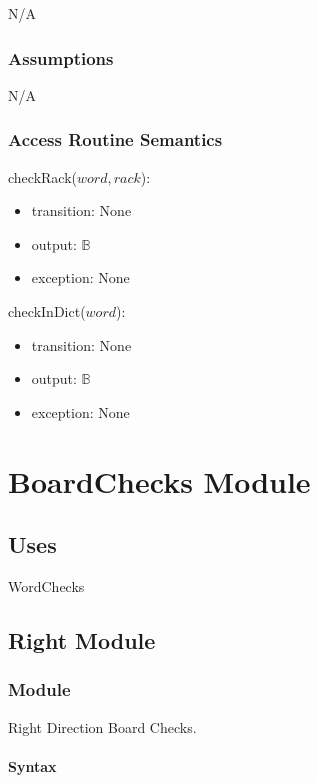 \documentclass[12pt]{article}
\begin{document}
N/A

\subsubsection* {Assumptions}

N/A

\subsubsection* {Access Routine Semantics}

\noindent checkRack($word, rack$):
\begin{itemize}
\item transition: None
\item output: $\mathbb{B}$
\item exception: None
\end{itemize}

\noindent checkInDict($word$):
\begin{itemize}
\item transition: None
\item output: $\mathbb{B}$
\item exception: None
\end{itemize}

\newpage

\section* {BoardChecks Module}

\subsection* {Uses}

WordChecks

\subsection*{Right Module}

\subsubsection*{Module}

Right Direction Board Checks.

\paragraph*{Syntax}
\end{document}
